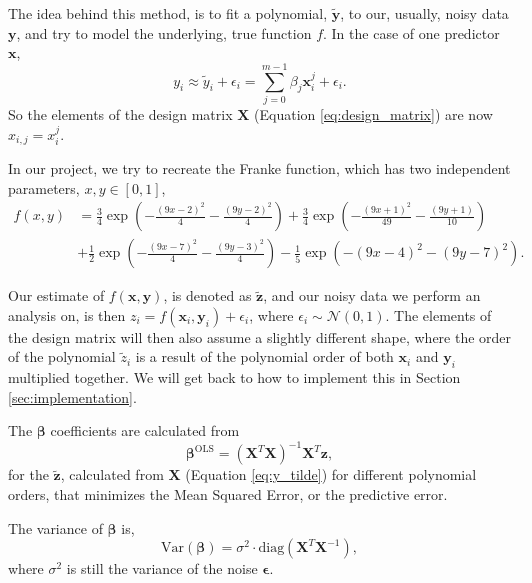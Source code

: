 \documentclass[a4paper,10pt,english]{article}
\begin{document}
The idea behind this method, is to fit a polynomial, $\bm{{\tilde y}}$, to our, usually, noisy data $\bm{{y}}$, and try to model the underlying, true function $f$. In the case of one predictor $\bm{{x}}$,
\begin{equation}
y_i \approx \tilde y_i + \epsilon_i = \sum_{j=0}^{m-1}\beta_j \bm{{x}}^{j}_i + \epsilon_i.
\end{equation}
So the elements of the design matrix $\bm{{X}}$ (Equation \ref{eq:design_matrix})
are now $x_{i,j}=x_i^j$.

In our project, we try to recreate the Franke function, which has two independent parameters, $x, y \in [0, 1]$,
\begin{equation}
\begin{aligned} 
f(x, y) &=\frac{3}{4} \exp \left(-\frac{(9 x-2)^{2}}{4}-\frac{(9 y-2)^{2}}{4}\right)+\frac{3}{4} \exp \left(-\frac{(9 x+1)^{2}}{49}-\frac{(9 y+1)}{10}\right) \\
&+\frac{1}{2} \exp \left(-\frac{(9 x-7)^{2}}{4}-\frac{(9 y-3)^{2}}{4}\right)-\frac{1}{5} \exp \left(-(9 x-4)^{2}-(9 y-7)^{2}\right).
\end{aligned}
\end{equation}

Our estimate of $f(\bm{{x}},\bm{{y}})$, is denoted as $\bm{{\tilde z}}$, and our noisy data we perform an analysis on, is then $z_i= f(\bm{{x}}_i,\bm{{y}}_i) + \epsilon_i$, where $\epsilon_i\sim \mathcal{N}(0,1)$. The elements of the design matrix will then also assume a slightly different shape, where the order of the polynomial $\tilde z_i$ is a result of the polynomial order of both $\bm{{x}}_i$ and $\bm{{y}}_i$ multiplied together. We will get back to how to implement this in Section \ref{sec:implementation}.

The $\bm{{\beta}}$ coefficients are calculated from
\begin{equation}
\bm{{\beta}}^\mathrm{OLS} = (\bm{{X}}^T\bm{{X}})^{-1}\bm{{X}}^T\bm{{z}},
\end{equation}
for the $\bm{{\tilde z}}$, calculated from $\bm{{X}}$ (Equation \ref{eq:y_tilde}) for different polynomial orders, that minimizes the Mean Squared Error, or the predictive error.

The variance of $\bm{{\beta}}$ is,
\begin{equation}
\mathrm{Var}(\bm{{\beta}}) = \sigma^2\cdot\mathrm{diag}(\bm{{X}}^T\bm{{X}}^{-1}),
\end{equation}
where $\sigma^2$ is still the variance of the noise $\bm{\epsilon}$.
%
%
\end{document}
